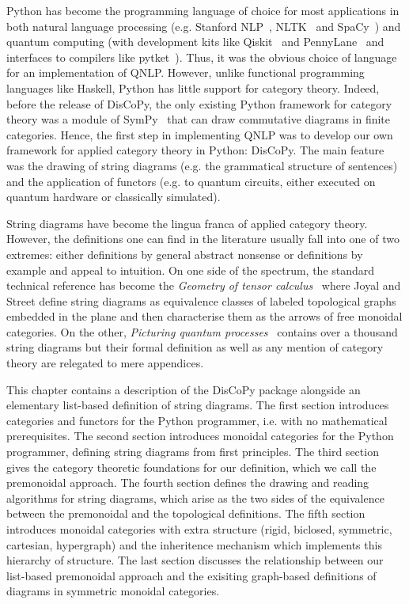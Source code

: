 
Python has become the programming language of choice for most applications in both natural language processing (e.g. Stanford NLP~\cite{ManningEtAl14}, NLTK~\cite{LoperBird02} and SpaCy~\cite{HonnibalMontani17}) and quantum computing (with development kits like Qiskit~\cite{Cross18} and PennyLane~\cite{BergholmEtAl20} and interfaces to compilers like pytket~\cite{SivarajahEtAl20}).
Thus, it was the obvious choice of language for an implementation of QNLP.
However, unlike functional programming languages like Haskell, Python has little support for category theory.
Indeed, before the release of DisCoPy, the only existing Python framework for category theory was a module of SymPy~\cite{MeurerEtAl17} that can draw commutative diagrams in finite categories.
Hence, the first step in implementing QNLP was to develop our own framework for applied category theory in Python: DisCoPy.
The main feature was the drawing of string diagrams (e.g. the grammatical structure of sentences) and the application of functors (e.g. to quantum circuits, either executed on quantum hardware or classically simulated).

String diagrams have become the lingua franca of applied category theory.
However, the definitions one can find in the literature usually fall into one of two extremes: either definitions by general abstract nonsense or definitions by example and appeal to intuition.
On one side of the spectrum, the standard technical reference has become the \emph{Geometry of tensor calculus}~\cite{JoyalStreet91} where Joyal and Street define string diagrams as equivalence classes of labeled topological graphs embedded in the plane and then characterise them as the arrows of free monoidal categories.
On the other, \emph{Picturing quantum processes}~\cite{CoeckeKissinger17} contains over a thousand string diagrams but their formal definition as well as any mention of category theory are relegated to mere appendices.

This chapter contains a description of the DisCoPy package alongside an elementary list-based definition of string diagrams.
The first section introduces categories and functors for the Python programmer, i.e. with no mathematical prerequisites.
The second section introduces monoidal categories for the Python programmer, defining string diagrams from first principles.
The third section gives the category theoretic foundations for our definition, which we call the premonoidal approach.
The fourth section defines the drawing and reading algorithms for string diagrams, which arise as the two sides of the equivalence between the premonoidal and the topological definitions.
The fifth section introduces monoidal categories with extra structure (rigid, biclosed, symmetric, cartesian, hypergraph) and the inheritence mechanism which implements this hierarchy of structure.
The last section discusses the relationship between our list-based premonoidal approach and the exisiting graph-based definitions of diagrams in symmetric monoidal categories.
